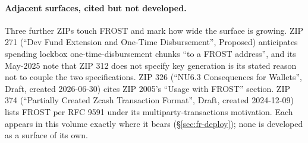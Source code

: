 \documentclass[11pt,a4paper]{article}
\theoremstyle{definition}
\begin{document}
\paragraph{Adjacent surfaces, cited but not developed.} Three further
ZIPs touch FROST and mark how wide the surface is growing. ZIP 271
(``Dev Fund Extension and One-Time Disbursement'', Proposed) anticipates
spending lockbox one-time-disbursement chunks ``to a FROST address'',
and its May-2025 note that ZIP 312 does not specify key generation is
its stated reason not to couple the two specifications. ZIP 326
(``NU6.3 Consequences for Wallets'', Draft, created 2026-06-30) cites
ZIP 2005's ``Usage with FROST'' section. ZIP 374 (``Partially Created
Zcash Transaction Format'', Draft, created 2024-12-09) lists FROST per
RFC 9591 under its multiparty-transactions motivation. Each appears in
this volume exactly where it bears (\S\ref{sec:fr-deploy}); none is
developed as a surface of its own.
\end{document}
